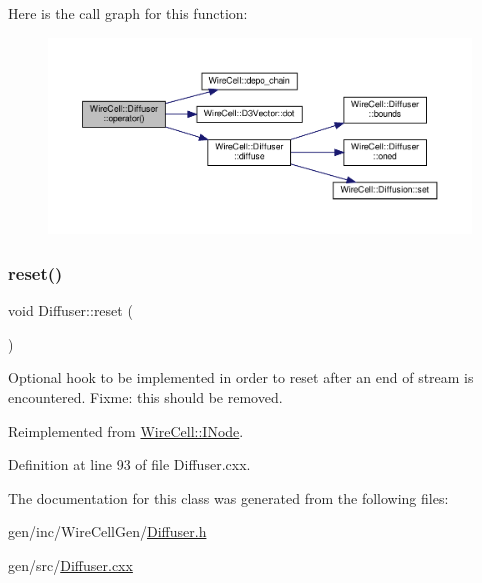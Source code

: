 Here is the call graph for this function\+:
\nopagebreak
\begin{figure}[H]
\begin{center}
\leavevmode
\includegraphics[width=350pt]{class_wire_cell_1_1_diffuser_a05506f9621f1221253d4d4f6701ca180_cgraph}
\end{center}
\end{figure}
\mbox{\label{class_wire_cell_1_1_diffuser_abeacee310fe7c9ec3067c679319c33bd}} 
\subsubsection{\texorpdfstring{reset()}{reset()}}
{\footnotesize\ttfamily void Diffuser\+::reset (\begin{DoxyParamCaption}{ }\end{DoxyParamCaption})\hspace{0.3cm}{\ttfamily [virtual]}}

Optional hook to be implemented in order to reset after an end of stream is encountered. Fixme\+: this should be removed. 

Reimplemented from \hyperlink{class_wire_cell_1_1_i_node_a7bf4dfff146b72f866ab25f7662c56a0}{Wire\+Cell\+::\+I\+Node}.



Definition at line 93 of file Diffuser.\+cxx.



The documentation for this class was generated from the following files\+:\begin{DoxyCompactItemize}
\item 
gen/inc/\+Wire\+Cell\+Gen/\hyperlink{_diffuser_8h}{Diffuser.\+h}\item 
gen/src/\hyperlink{_diffuser_8cxx}{Diffuser.\+cxx}\end{DoxyCompactItemize}
